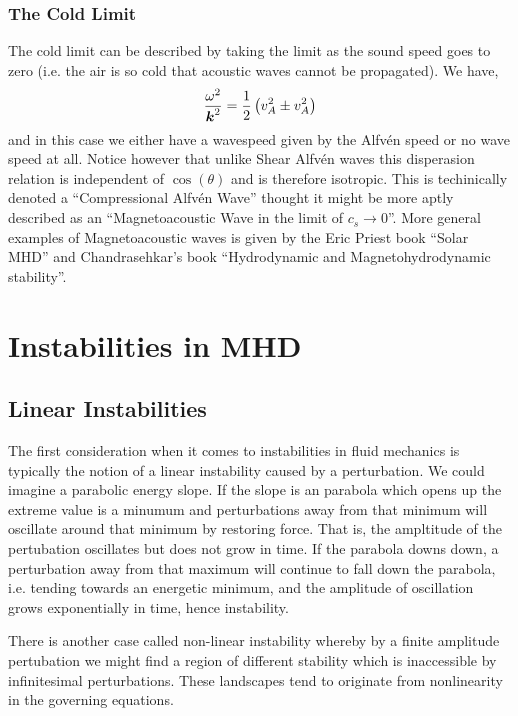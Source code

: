 \documentclass{article}
\begin{document}
\subsubsection{The Cold Limit}
The cold limit can be described by taking the limit as the sound speed goes to
zero (i.e. the air is so cold that acoustic waves cannot be propagated).  We
have, 
\begin{gather*}
    \frac{\omega^2}{\boldsymbol{k}^2} = \frac{1}{2}\left(v_A^2\pm v_A^2\right)
\end{gather*}
and in this case we either have a wavespeed given by the Alfv\'en speed or no wave
speed at all. Notice however that unlike Shear Alfv\'en waves this disperasion
relation is independent of $\cos(\theta)$ and is therefore isotropic. This is
techinically denoted a ``Compressional Alfv\'en Wave'' thought it might be more
aptly described as an ``Magnetoacoustic Wave in the limit of $c_s \to 0$''. More
general examples of Magnetoacoustic waves is given by the Eric Priest book
``Solar MHD'' and Chandrasehkar's book ``Hydrodynamic and Magnetohydrodynamic
stability''. 


\section{Instabilities in MHD}

\subsection{Linear Instabilities}
The first consideration when it comes to instabilities in fluid mechanics is
typically the notion of a linear instability caused by a perturbation. We could
imagine a parabolic energy slope. If the slope is an parabola which opens up the
extreme value is a minumum and perturbations away from that minimum will
oscillate around that minimum by restoring force. That is, the ampltitude of the
pertubation oscillates but does not grow in time. If the parabola downs down, a
perturbation away from that maximum will continue to fall down the parabola,
i.e. tending towards an energetic minimum, and the amplitude of oscillation
grows exponentially in time, hence instability. 

There is another case called non-linear instability whereby by a finite
amplitude pertubation we might find a region of different stability which is
inaccessible by infinitesimal perturbations. These landscapes tend to originate
from nonlinearity in the governing equations. 
\end{document}

